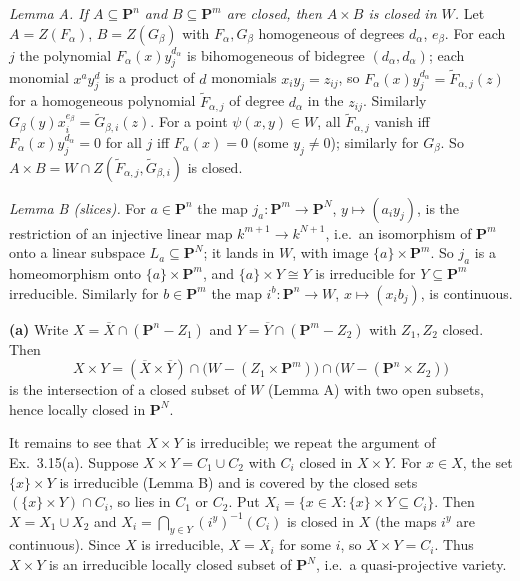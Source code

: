 \documentclass[11pt]{article}
\begin{document}
\emph{Lemma A. If $A\subseteq\mathbf P^n$ and $B\subseteq\mathbf P^m$ are closed, then $A\times B$ is closed in $W$.} Let $A=Z(F_\alpha)$, $B=Z(G_\beta)$ with $F_\alpha,G_\beta$ homogeneous of degrees $d_\alpha$, $e_\beta$. For each $j$ the polynomial $F_\alpha(x)y_j^{d_\alpha}$ is bihomogeneous of bidegree $(d_\alpha,d_\alpha)$; each monomial $x^{a}y_j^{d}$ is a product of $d$ monomials $x_{i}y_j=z_{ij}$, so $F_\alpha(x)y_j^{d_\alpha}=\tilde F_{\alpha,j}(z)$ for a homogeneous polynomial $\tilde F_{\alpha,j}$ of degree $d_\alpha$ in the $z_{ij}$. Similarly $G_\beta(y)x_i^{e_\beta}=\tilde G_{\beta,i}(z)$. For a point $\psi(x,y)\in W$, all $\tilde F_{\alpha,j}$ vanish iff $F_\alpha(x)y_j^{d_\alpha}=0$ for all $j$ iff $F_\alpha(x)=0$ (some $y_j\ne0$); similarly for $G_\beta$. So $A\times B=W\cap Z(\tilde F_{\alpha,j},\tilde G_{\beta,i})$ is closed.

\emph{Lemma B (slices).} For $a\in\mathbf P^n$ the map $j_a\colon\mathbf P^m\to\mathbf P^N$, $y\mapsto(a_iy_j)$, is the restriction of an injective linear map $k^{m+1}\to k^{N+1}$, i.e.\ an isomorphism of $\mathbf P^m$ onto a linear subspace $L_a\subseteq\mathbf P^N$; it lands in $W$, with image $\{a\}\times\mathbf P^m$. So $j_a$ is a homeomorphism onto $\{a\}\times\mathbf P^m$, and $\{a\}\times Y\cong Y$ is irreducible for $Y\subseteq\mathbf P^m$ irreducible. Similarly for $b\in\mathbf P^m$ the map $i^b\colon\mathbf P^n\to W$, $x\mapsto(x_ib_j)$, is continuous.

\textbf{(a)} Write $X=\overline X\cap(\mathbf P^n-Z_1)$ and $Y=\overline Y\cap(\mathbf P^m-Z_2)$ with $Z_1,Z_2$ closed. Then
\[
X\times Y=(\overline X\times\overline Y)\cap\bigl(W-(Z_1\times\mathbf P^m)\bigr)\cap\bigl(W-(\mathbf P^n\times Z_2)\bigr)
\]
is the intersection of a closed subset of $W$ (Lemma A) with two open subsets, hence locally closed in $\mathbf P^N$.

It remains to see that $X\times Y$ is irreducible; we repeat the argument of Ex.~3.15(a). Suppose $X\times Y=C_1\cup C_2$ with $C_i$ closed in $X\times Y$. For $x\in X$, the set $\{x\}\times Y$ is irreducible (Lemma B) and is covered by the closed sets $(\{x\}\times Y)\cap C_i$, so lies in $C_1$ or $C_2$. Put $X_i=\{x\in X:\{x\}\times Y\subseteq C_i\}$. Then $X=X_1\cup X_2$ and $X_i=\bigcap_{y\in Y}(i^y)^{-1}(C_i)$ is closed in $X$ (the maps $i^y$ are continuous). Since $X$ is irreducible, $X=X_i$ for some $i$, so $X\times Y=C_i$. Thus $X\times Y$ is an irreducible locally closed subset of $\mathbf P^N$, i.e.\ a quasi-projective variety.
\end{document}
